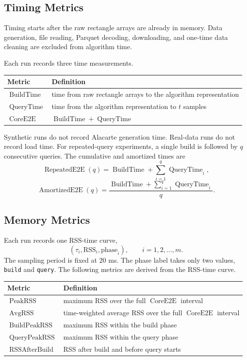 \documentclass[11pt]{article}
\newcommand{\BuildTime}{\ensuremath{\operatorname{BuildTime}}}
\newcommand{\QueryTime}{\ensuremath{\operatorname{QueryTime}}}
\newcommand{\CoreE}{\ensuremath{\operatorname{CoreE2E}}}
\newcommand{\PeakRSS}{\ensuremath{\operatorname{PeakRSS}}}
\newcommand{\AvgRSS}{\ensuremath{\operatorname{AvgRSS}}}
\newcommand{\BuildPeakRSS}{\ensuremath{\operatorname{BuildPeakRSS}}}
\newcommand{\QueryPeakRSS}{\ensuremath{\operatorname{QueryPeakRSS}}}
\newcommand{\RSSAfterBuild}{\ensuremath{\operatorname{RSSAfterBuild}}}
\newcommand{\RepeatedE}{\ensuremath{\operatorname{RepeatedE2E}}}
\newcommand{\AmortizedE}{\ensuremath{\operatorname{AmortizedE2E}}}
\newcommand{\status}[1]{\texttt{#1}}
\begin{document}
\subsection{Timing Metrics}
Timing starts after the raw rectangle arrays are already in memory.  Data generation, file reading, Parquet decoding, downloading, and one-time data cleaning are excluded from algorithm time.

Each run records three time measurements.

\begin{center}
\begin{tabularx}{\linewidth}{@{}lY@{}}
\toprule
Metric & Definition \\
\midrule
\BuildTime & time from raw rectangle arrays to the algorithm representation \\
\QueryTime & time from the algorithm representation to $t$ samples \\
\CoreE & $\BuildTime+\QueryTime$ \\
\bottomrule
\end{tabularx}
\end{center}

Synthetic runs do not record Alacarte generation time.  Real-data runs do not record load time.  For repeated-query experiments, a single build is followed by $q$ consecutive queries.  The cumulative and amortized times are
\[
\RepeatedE(q)=\BuildTime+\sum_{i=1}^{q}\QueryTime_i,
\]
\[
\AmortizedE(q)=
\frac{\BuildTime+\sum_{i=1}^{q}\QueryTime_i}{q}.
\]

\subsection{Memory Metrics}
Each run records one RSS-time curve,
\[
(\tau_i,\mathrm{RSS}_i,\mathrm{phase}_i),
\qquad i=1,2,\ldots,m.
\]
The sampling period is fixed at $20$ ms.  The phase label takes only two values, \status{build} and \status{query}.  The following metrics are derived from the RSS-time curve.

\begin{center}
\begin{tabularx}{\linewidth}{@{}lY@{}}
\toprule
Metric & Definition \\
\midrule
\PeakRSS & maximum RSS over the full \CoreE{} interval \\
\AvgRSS & time-weighted average RSS over the full \CoreE{} interval \\
\BuildPeakRSS & maximum RSS within the build phase \\
\QueryPeakRSS & maximum RSS within the query phase \\
\RSSAfterBuild & RSS after build and before query starts \\
\bottomrule
\end{tabularx}
\end{center}
\end{document}

